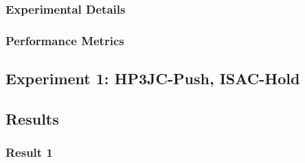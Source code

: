 \documentclass[a4paper, 10pt, conference]{ieeeconf}        %
\begin{document}
\subsubsection{Experimental Details} \label{subsec:Experimental Details}

\subsubsection{Performance Metrics} \label{subsec:Performance Metrics}


\subsection{Experiment 1: HP3JC-Push, ISAC-Hold}\label{sec:Exp1}

\subsection{Results}\label{subsec:Results}
\subsubsection{Result 1}
\end{document}
